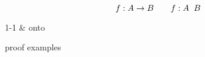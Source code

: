 

\begin{frame}{}
  \begin{definition}
    \[
      f: A \to B \qquad f: A \textcolor{red}{\;\;} B
    \]

    \vspace{0.50cm}
    \centerline{1-1 \& onto}
  \end{definition}
\end{frame}

\begin{frame}{}
  proof examples
\end{frame}

\begin{frame}{}
\end{frame}

\begin{frame}{}

\end{frame}
